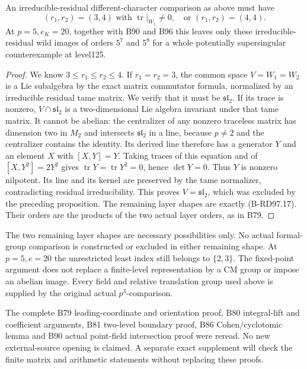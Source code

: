 \begin{corollary}
\label{cor:B-RD97-layers}
An irreducible-residual different-character comparison as above
must have
\[
 (r_1,r_2)=(3,4)\text{ with }\operatorname{tr}|_{W_1}\ne0,
 \quad\text{or }(r_1,r_2)=(4,4).                    \tag{B-RD97.17}
\]
At $p=5,e_K=20$, together with B90 and B96 this leaves only
these irreducible-residual wild images of orders $5^7$ and $5^8$
for a whole potentially supersingular counterexample at level125.
\end{corollary}
\begin{proof}
We know $3\le r_1\le r_2\le4$. If $r_1=r_2=3$, the common
space $V=W_1=W_2$ is a Lie subalgebra by the exact matrix
commutator formula, normalized by an irreducible residual tame
matrix. We verify that it must be $\mathfrak{sl}_2$.
If its trace is nonzero, $V\cap\mathfrak{sl}_2$ is a
two-dimensional Lie algebra invariant under that tame matrix.
It cannot be abelian: the centralizer of any nonzero traceless
matrix has dimension two in $M_2$ and intersects $\mathfrak{sl}_2$
in a line, because $p\ne2$ and the centralizer contains the identity.
Its derived line therefore has a generator $Y$ and an element
$X$ with $[X,Y]=Y$. Taking traces of this equation and of
$[X,Y^2]=2Y^2$ gives $\operatorname{tr}Y=
\operatorname{tr}Y^2=0$, hence $\det Y=0$.
Thus $Y$ is nonzero nilpotent. Its line and its kernel are
preserved by the tame normalizer, contradicting residual
irreducibility. This proves $V=\mathfrak{sl}_2$, which was
excluded by the preceding proposition. The remaining layer
shapes are exactly (B-RD97.17). Their orders are the products
of the two actual layer orders, as in B79.
\end{proof}

\begin{remark}
\label{rem:B-RD97-scope}
The two remaining layer shapes are necessary possibilities only.
No actual formal-group comparison is constructed or excluded in
either remaining shape. At $p=5,e=20$ the unrestricted least index
still belongs to $\{2,3\}$. The fixed-point argument does not
replace a finite-level representation by a CM group or impose an
abelian image. Every field and relative translation group used
above is supplied by the original actual $p^3$-comparison.

The complete B79 leading-coordinate and orientation proof, B80
integral-lift and coefficient arguments, B81 two-level boundary
proof, B86 Cohen/cyclotomic lemma and B90 actual point-field
intersection proof were reread. No new external-source opening
is claimed. A separate exact supplement will check the finite
matrix and arithmetic statements without replacing these proofs.
\end{remark}
